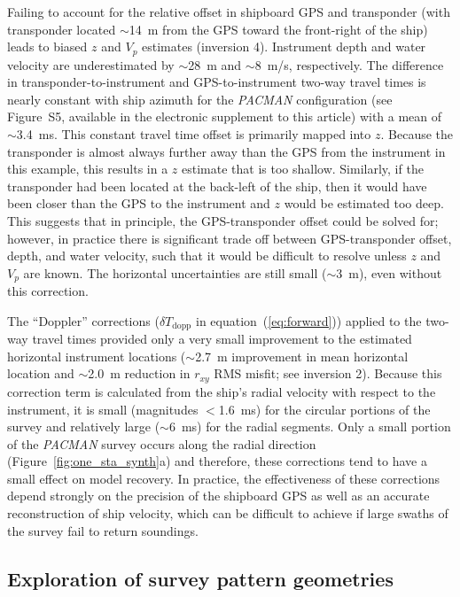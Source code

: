 Failing to account for the relative offset in shipboard GPS and transponder (with transponder located $\sim$14~m from the GPS toward the front-right of the ship) leads to biased $z$ and $V_p$ estimates (inversion 4). Instrument depth and water velocity are underestimated by $\sim$28~m and $\sim$8~m/s, respectively. The difference in transponder-to-instrument and GPS-to-instrument two-way travel times is nearly constant with ship azimuth for the \textit{PACMAN} configuration (see Figure~S5, available in the electronic supplement to this article) with a mean of $\sim$3.4~ms. This constant travel time offset is primarily mapped into $z$. Because the transponder is almost always further away than the GPS from the instrument in this example, this results in a $z$ estimate that is too shallow. Similarly, if the transponder had been located at the back-left of the ship, then it would have been closer than the GPS to the instrument and $z$ would be estimated too deep. This suggests that in principle, the GPS-transponder offset could be solved for; however, in practice there is significant trade off between GPS-transponder offset, depth, and water velocity, such that it would be difficult to resolve unless $z$ and $V_p$ are known. The horizontal uncertainties are still small ($\sim$3~m), even without this correction.

The ``Doppler'' corrections ($\delta T_{\text{dopp}}$ in equation~(\ref{eq:forward})) applied to the two-way travel times provided only a very small improvement to the estimated horizontal instrument locations ($\sim$2.7~m improvement in mean horizontal location and $\sim$2.0~m reduction in $r_{xy}$ RMS misfit; see inversion 2). Because this correction term is calculated from the ship's radial velocity with respect to the instrument, it is small (magnitudes $<$1.6~ms) for the circular portions of the survey and relatively large ($\sim$6~ms) for the radial segments. Only a small portion of the \textit{PACMAN} survey occurs along the radial direction (Figure~\ref{fig:one_sta_synth}a) and therefore, these corrections tend to have a small effect on model recovery. In practice, the effectiveness of these corrections depend strongly on the precision of the shipboard GPS as well as an accurate reconstruction of ship velocity, which can be difficult to achieve if large swaths of the survey fail to return soundings.


\subsection{Exploration of survey pattern geometries} \label{sec:surv_geom_tests}

